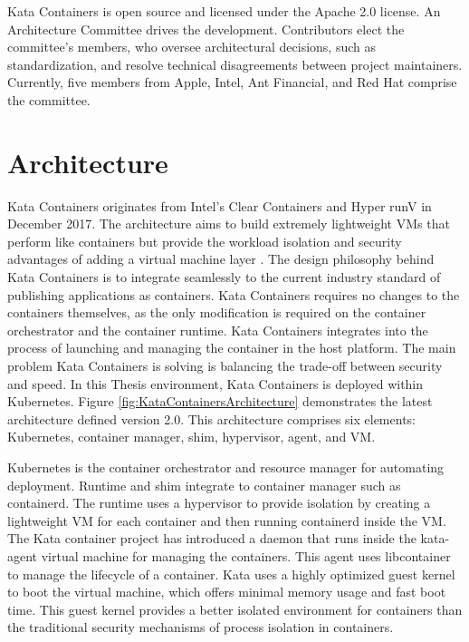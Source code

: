 Kata Containers is open source and licensed under the Apache 2.0 license. An Architecture Committee drives the development. Contributors elect the committee's members, who oversee architectural decisions, such as standardization, and resolve technical disagreements between project maintainers. Currently, five members from Apple, Intel, Ant Financial, and Red Hat comprise the committee. \cite{KataContainers}\cite{KataContainersGovernance}

\section{Architecture}

Kata Containers originates from Intel's Clear Containers \cite{ClearContainers} and Hyper runV \cite{runV} in December 2017. The architecture aims to build extremely lightweight VMs that perform like containers but provide the workload isolation and security advantages of adding a virtual machine layer \cite{Randazzo2019}. The design philosophy behind Kata Containers is to integrate seamlessly to the current industry standard of publishing applications as containers. Kata Containers requires no changes to the containers themselves, as the only modification is required on the container orchestrator and the container runtime. Kata Containers integrates into the process of launching and managing the container in the host platform. The main problem Kata Containers is solving is balancing the trade-off between security and speed. In this Thesis environment, Kata Containers is deployed within Kubernetes. Figure \ref{fig:KataContainersArchitecture} demonstrates the latest architecture defined version 2.0. This architecture comprises six elements: Kubernetes, container manager, shim, hypervisor, agent, and VM.

Kubernetes is the container orchestrator and resource manager for automating deployment. Runtime and shim integrate to container manager such as containerd. The runtime uses a hypervisor to provide isolation by creating a lightweight VM for each container and then running containerd inside the VM. The Kata container project has introduced a daemon that runs inside the kata-agent virtual machine for managing the containers. This agent uses libcontainer to manage the lifecycle of a container. Kata uses a highly optimized guest kernel to boot the virtual machine, which offers minimal memory usage and fast boot time. This guest kernel provides a better isolated environment for containers than the traditional security mechanisms of process isolation in containers. \cite{Kumar2020}

